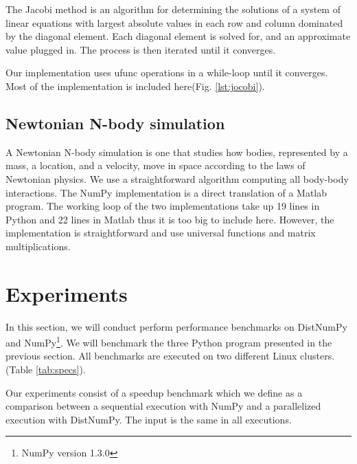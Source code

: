 \documentclass[10pt]{article}
\begin{document}
The Jacobi method is an algorithm for determining the solutions of a system of linear equations with largest absolute values in each row and column dominated by the diagonal element. Each diagonal element is solved for, and an approximate value plugged in. The process is then iterated until it converges.

Our implementation uses ufunc operations in a while-loop until it converges. Most of the implementation is included here(Fig. \ref{lst:jocobi}).



\subsection{Newtonian N-body simulation}
A Newtonian N-body simulation is one that studies how bodies, represented by a mass, a location, and a velocity, move in space according to the laws of Newtonian physics. We use a straightforward algorithm computing all body-body interactions. The NumPy implementation is a direct translation of a Matlab program\cite{assignmentNbody}. The working loop of the two implementations take up 19 lines in Python and 22 lines in Matlab thus it is too big to include here. However, the implementation is straightforward and use universal functions and matrix multiplications.


\section{Experiments}
In this section, we will conduct perform performance benchmarks on DistNumPy and NumPy\footnote{NumPy version 1.3.0}. We will benchmark the three Python program presented in the previous section. All benchmarks are executed on two different Linux clusters. (Table \ref{tab:specs}).

Our experiments consist of a speedup benchmark which we define as a comparison between a sequential execution with NumPy and a parallelized execution with DistNumPy. The input is the same in all executions.
\end{document}
